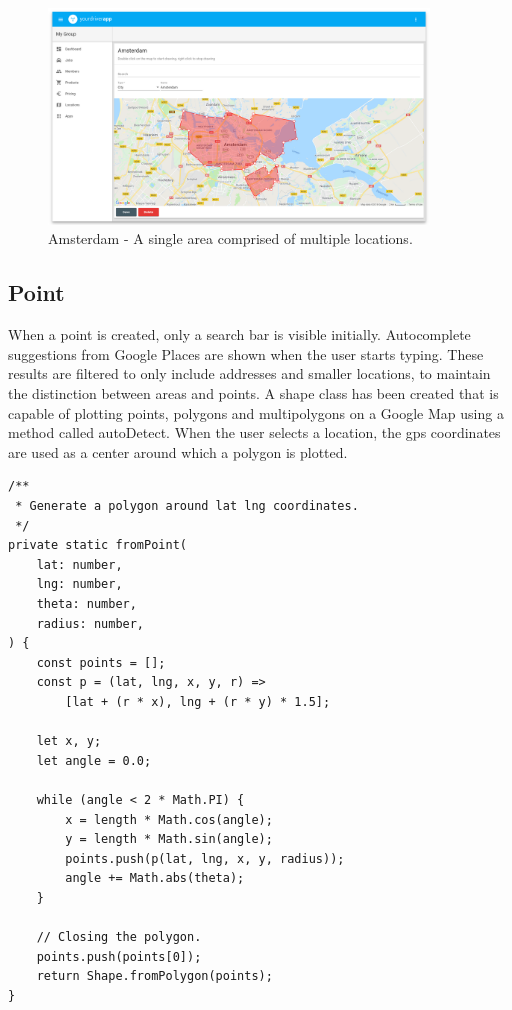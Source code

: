 \begin{figure}[H]
	\centering
	\includegraphics[width=0.9\textwidth]{AmsterdamShadow}
	\caption[Amsterdam Drawn Polygon]{Amsterdam - A single area comprised of multiple locations.}
	\label{fig:Amsterdam Drawn Polygon}
\end{figure}

\subsection{Point}
When a point is created, only a search bar is visible initially. Autocomplete suggestions from Google Places are shown when the user starts typing. These results are filtered to only include addresses and smaller locations, to maintain the distinction between areas and points. A shape class has been created that is capable of plotting points, polygons and multipolygons on a Google Map using a method called autoDetect. When the user selects a location, the gps coordinates are used as a center around which a polygon is plotted.

\begin{center}
\noindent\begin{minipage}{.85\textwidth}
\begin{lstlisting}[caption={Generating Polygon From Point.}, label={lst:Generating Polygon From Point}]
/**
 * Generate a polygon around lat lng coordinates.
 */
private static fromPoint(
	lat: number,
	lng: number,
	theta: number,
	radius: number,
) {
	const points = [];
	const p = (lat, lng, x, y, r) =>
		[lat + (r * x), lng + (r * y) * 1.5];

	let x, y;
	let angle = 0.0;

	while (angle < 2 * Math.PI) {
		x = length * Math.cos(angle);
		y = length * Math.sin(angle);
		points.push(p(lat, lng, x, y, radius));
		angle += Math.abs(theta);
	}

	// Closing the polygon.
	points.push(points[0]);
	return Shape.fromPolygon(points);
}
\end{lstlisting}
\end{minipage}
\end{center}

